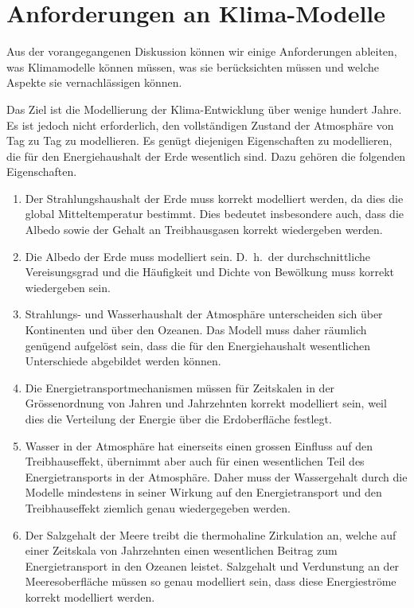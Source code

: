 %
%
%

\section{Anforderungen an Klima-Modelle\label{section:anforderungen}}
Aus der vorangegangenen Diskussion können wir einige Anforderungen
ableiten, was Klimamodelle können müssen, was sie berücksichten
müssen und welche Aspekte sie vernachlässigen können.

Das Ziel ist die Modellierung der Klima-Entwicklung über wenige
hundert Jahre.
Es ist jedoch nicht erforderlich, den vollständigen Zustand der
Atmosphäre von Tag zu Tag zu modellieren.
Es genügt diejenigen Eigenschaften zu modellieren, die 
für den Energiehaushalt der Erde wesentlich sind.
Dazu gehören die folgenden Eigenschaften.
\begin{enumerate}
\item
Der Strahlungshaushalt der Erde muss korrekt modelliert werden,
da dies die global Mitteltemperatur bestimmt.
Dies bedeutet insbesondere auch, dass die Albedo sowie der Gehalt an
Treibhausgasen korrekt wiedergeben werden.
\item
Die Albedo der Erde muss modelliert sein. 
D.~h.~der durchschnittliche Vereisungsgrad und die Häufigkeit und
Dichte von Bewölkung muss korrekt wiedergeben sein.
\item
Strahlungs- und Wasserhaushalt der Atmosphäre unterscheiden sich
über Kontinenten und über den Ozeanen.
Das Modell muss daher räumlich genügend aufgelöst sein, dass die
für den Energiehaushalt wesentlichen Unterschiede abgebildet
werden können.
\item
Die Energietransportmechanismen müssen für Zeitskalen in der Grössenordnung
von Jahren und Jahrzehnten korrekt modelliert sein, weil dies die
Verteilung der Energie über die Erdoberfläche festlegt.
\item
Wasser in der Atmosphäre hat einerseits einen grossen Einfluss auf
den Treibhauseffekt, übernimmt aber auch für einen wesentlichen Teil
des Energietransports in der Atmosphäre.
Daher muss der Wassergehalt durch die Modelle mindestens in seiner
Wirkung auf den Energietransport und den Treibhauseffekt
ziemlich genau wiedergegeben werden.
\item
Der Salzgehalt der Meere treibt die thermohaline Zirkulation an, welche
auf einer Zeitskala von Jahrzehnten einen wesentlichen Beitrag zum
Energietransport in den Ozeanen leistet.
Salzgehalt und Verdunstung an der Meeresoberfläche müssen so genau
modelliert sein, dass diese Energieströme korrekt modelliert werden.
\end{enumerate}

